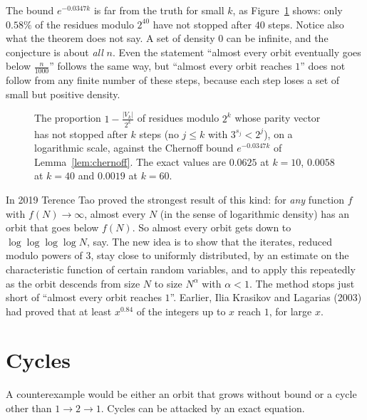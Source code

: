 The bound $e^{-0.0347k}$ is far from the truth for small $k$, as Figure~\ref{fig:terras} shows: only $0.58\%$ of the residues modulo $2^{40}$ have not
stopped after $40$ steps. Notice also what the theorem does not say. A set of density $0$ can be infinite, and the conjecture is about \emph{all}
$n$. Even the statement ``almost every orbit eventually goes below $\frac n{1000}$'' follows the same way, but ``almost every orbit reaches $1$'' does not
follow from any finite number of these steps, because each step loses a set of small but positive density.

\begin{figure}[ht]
\centering
{}
\caption{The proportion $1-\frac{|V_k|}{2^k}$ of residues modulo $2^k$ whose parity vector has not stopped after $k$ steps (no $j\le k$ with
$3^{s_j}<2^j$), on a logarithmic scale, against the Chernoff bound $e^{-0.0347k}$ of Lemma~\ref{lem:chernoff}. The exact values are $0.0625$ at
$k=10$, $0.0058$ at $k=40$ and $0.0019$ at $k=60$.}
\label{fig:terras}
\end{figure}

\begin{remark}\label{rem:tao}
In 2019 Terence Tao proved the strongest result of this kind: for \emph{any} function $f$ with $f(N)\to\infty$, almost every $N$ (in the sense of
logarithmic density) has an orbit that goes below $f(N)$. So almost every orbit gets down to $\log\log\log\log N$, say. The new idea is to show that the
iterates, reduced modulo powers of $3$, stay close to uniformly distributed, by an estimate on the characteristic function of certain random variables,
and to apply this repeatedly as the orbit descends from size $N$ to size $N^{\alpha}$ with $\alpha<1$. The method stops just short of ``almost every orbit reaches $1$''.
Earlier, Ilia Krasikov and Lagarias (2003) had proved that at least $x^{0.84}$ of the integers up to $x$ reach $1$, for large $x$.
\end{remark}

\section{Cycles}

A counterexample would be either an orbit that grows without bound or a cycle other than $1\to2\to1$. Cycles can be attacked by an exact equation.

